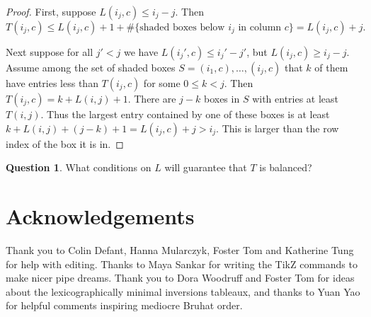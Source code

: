 \documentclass{article}
\theoremstyle{definition}
\newtheorem{question}[theorem]{Question}
\begin{document}
\begin{proof}
    First, suppose $L(i_j,c) \leq i_j - j$. Then 
    $$T(i_j,c) \leq L(i_j,c) + 1 + \#\{\text{shaded boxes below } i_j \text{ in column } c\} = L(i_j,c) + j.$$

 Next suppose for all $j'<j$ we have $L(i_j',c) \leq i_j' - j'$, but $L(i_j,c) \geq i_j - j$. Assume among the set of shaded boxes $S = (i_1,c), \dots, (i_j,c)$ that $k$ of them have entries less than $T(i_j,c)$ for some $0 \leq k < j$. Then $T(i_j,c) = k + L(i,j) + 1$. There are $j-k$ boxes in $S$ with entries at least $T(i,j)$. Thus the largest entry contained by one of these boxes is at least $k + L(i,j) + (j-k) + 1 = L(i_j,c) + j > i_j$. This is larger than the row index of the box it is in.  
\end{proof}


\begin{question}
    What conditions on $L$ will guarantee that $T$ is balanced?
\end{question}

\section{Acknowledgements} 
Thank you to Colin Defant, Hanna Mularczyk, Foster Tom and Katherine Tung for help with editing. Thanks to Maya Sankar for writing the TikZ commands to make nicer pipe dreams. Thank you to Dora Woodruff and Foster Tom for ideas about the lexicographically minimal inversions tableaux, and thanks to Yuan Yao for helpful comments inspiring mediocre Bruhat order.


\printbibliography 
\end{document}
